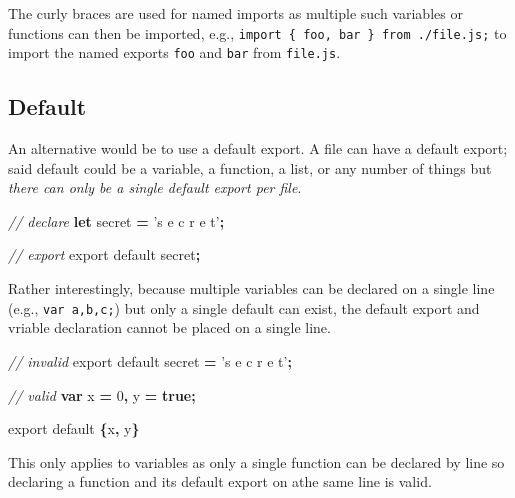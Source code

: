 \documentclass[10pt,]{krantz}
\makeatletter
\newenvironment{Shaded}{\begin{snugshade}}{\end{snugshade}}
\newcommand{\CommentTok}[1]{\textcolor[rgb]{0.37,0.37,0.37}{\textit{#1}}}
\newcommand{\DecValTok}[1]{\textcolor[rgb]{0.06,0.06,0.06}{#1}}
\newcommand{\ImportTok}[1]{#1}
\newcommand{\KeywordTok}[1]{\textcolor[rgb]{0.27,0.27,0.27}{\textbf{#1}}}
\newcommand{\NormalTok}[1]{#1}
\newcommand{\OperatorTok}[1]{\textcolor[rgb]{0.43,0.43,0.43}{\textbf{#1}}}
\newcommand{\StringTok}[1]{\textcolor[rgb]{0.5,0.5,0.5}{#1}}
\newenvironment{kframe}{%
\medskip{}
\setlength{\fboxsep}{.8em}
 \def\at@end@of@kframe{}%
 \ifinner\ifhmode%
  \def\at@end@of@kframe{\end{minipage}}%
  \begin{minipage}{\columnwidth}%
 \fi\fi%
 \def\FrameCommand##1{\hskip\@totalleftmargin \hskip-\fboxsep
 \colorbox{shadecolor}{##1}\hskip-\fboxsep
     \hskip-\linewidth \hskip-\@totalleftmargin \hskip\columnwidth}%
 \MakeFramed {\advance\hsize-\width
   \@totalleftmargin\z@ \linewidth\hsize
   \@setminipage}}%
 {\par\unskip\endMakeFramed%
 \at@end@of@kframe}
\renewenvironment{Shaded}{\begin{kframe}}{\end{kframe}}
\makeatother
\begin{document}
The curly braces are used for named imports as multiple such variables or functions can then be imported, e.g., \texttt{import\ \{\ foo,\ bar\ \}\ from\ \textquotesingle{}./file.js\textquotesingle{};} to import the named exports \texttt{foo} and \texttt{bar} from \texttt{file.js}.

\hypertarget{webpack-intro-import-export-default}{%
\subsection{Default}\label{webpack-intro-import-export-default}}

An alternative would be to use a default export. A file can have a default export; said default could be a variable, a function, a list, or any number of things but \emph{there can only be a single default export per file}.

\begin{Shaded}
\begin{Highlighting}[]
\CommentTok{// declare}
\KeywordTok{let}\NormalTok{ secret }\OperatorTok{=} \StringTok{'s e c r e t'}\OperatorTok{;}

\CommentTok{// export}
\ImportTok{export} \ImportTok{default}\NormalTok{ secret}\OperatorTok{;}
\end{Highlighting}
\end{Shaded}

Rather interestingly, because multiple variables can be declared on a single line (e.g., \texttt{var\ a,b,c;}) but only a single default can exist, the default export and vriable declaration cannot be placed on a single line.

\begin{Shaded}
\begin{Highlighting}[]
\CommentTok{// invalid}
\ImportTok{export} \ImportTok{default}\NormalTok{ secret }\OperatorTok{=} \StringTok{'s e c r e t'}\OperatorTok{;}

\CommentTok{// valid}
\KeywordTok{var}\NormalTok{ x }\OperatorTok{=} \DecValTok{0}\OperatorTok{,}
\NormalTok{    y }\OperatorTok{=} \KeywordTok{true}\OperatorTok{;}

\ImportTok{export} \ImportTok{default} \OperatorTok{\{}\NormalTok{x}\OperatorTok{,}\NormalTok{ y}\OperatorTok{\}}
\end{Highlighting}
\end{Shaded}

This only applies to variables as only a single function can be declared by line so declaring a function and its default export on athe same line is valid.
\end{document}
